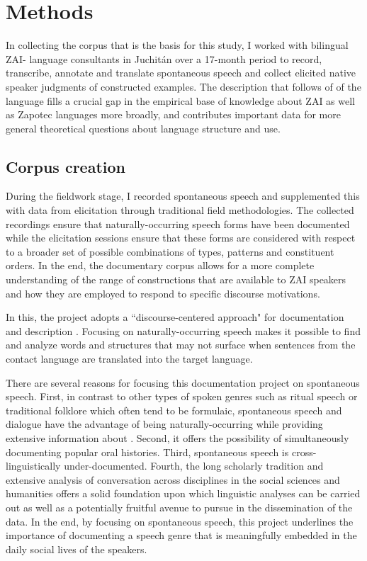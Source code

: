 \section{Methods}

\largerpage[-1]
In collecting the corpus that is the basis for this study, I worked with bilingual ZAI- language consultants in Juchit\'{a}n over a 17-month period to record, transcribe, annotate and translate spontaneous speech and collect elicited native speaker judgments of constructed examples. The description that follows of  of the language fills a crucial gap in the empirical base of knowledge about ZAI as well as Zapotec languages more broadly, and contributes important data for more general theoretical questions about language structure and use.

\subsection{Corpus creation}

During the fieldwork stage, I recorded spontaneous speech and supplemented this with data from elicitation through traditional field methodologies. The collected recordings ensure that naturally-occurring speech forms have been documented while the elicitation sessions  ensure that these forms are considered with respect to a broader set of possible combinations of  types,  patterns and constituent orders. In the end, the documentary corpus allows for a more complete understanding of the range of constructions that are available to ZAI speakers and how they are employed to respond to specific discourse motivations.

In this, the project adopts a ``discourse-centered approach" for documentation and description \citep{sherzer1987}. Focusing on naturally-occurring speech makes it possible to find and analyze words and structures that may not surface when sentences from the contact language are translated into the target language. 

There are several reasons for focusing this documentation project on spontaneous speech. First, in contrast to other types of spoken genres such as ritual speech or traditional folklore which often tend to be formulaic, spontaneous speech and dialogue have the advantage of being naturally-occurring while providing extensive information about . Second, it offers the possibility of simultaneously documenting popular oral histories. Third, spontaneous speech is cross-linguistically under-documented. Fourth, the long scholarly tradition and extensive analysis of conversation across disciplines in the social sciences and humanities offers a solid foundation upon which linguistic analyses can be carried out as well as a potentially fruitful avenue to pursue in the dissemination of the data. In the end, by focusing on spontaneous speech, this project underlines the importance of documenting a speech genre that is meaningfully embedded in the daily social lives of the speakers. 

